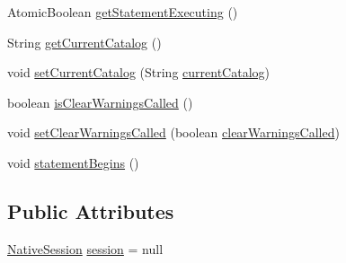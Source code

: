 \begin{DoxyCompactItemize}
\item 
Atomic\+Boolean \mbox{\hyperlink{classcom_1_1mysql_1_1cj_1_1_abstract_query_a1d16480e9a825e13d276fc18c90279cb}{get\+Statement\+Executing}} ()
\item 
String \mbox{\hyperlink{classcom_1_1mysql_1_1cj_1_1_abstract_query_a77d27488fdee8947c779e97796b433c3}{get\+Current\+Catalog}} ()
\item 
void \mbox{\hyperlink{classcom_1_1mysql_1_1cj_1_1_abstract_query_abf73f90a5df9f9b8efc2cc2aa477dfd8}{set\+Current\+Catalog}} (String \mbox{\hyperlink{classcom_1_1mysql_1_1cj_1_1_abstract_query_a1b25ce6bc0b1b35dca039d246b51da60}{current\+Catalog}})
\item 
boolean \mbox{\hyperlink{classcom_1_1mysql_1_1cj_1_1_abstract_query_a27bdd1ed787ed128edbbd307731e8120}{is\+Clear\+Warnings\+Called}} ()
\item 
void \mbox{\hyperlink{classcom_1_1mysql_1_1cj_1_1_abstract_query_a3a7177c2aad4e5a75cb3cbb556c05961}{set\+Clear\+Warnings\+Called}} (boolean \mbox{\hyperlink{classcom_1_1mysql_1_1cj_1_1_abstract_query_ad74a8ec76b857307a4271c7078454b8c}{clear\+Warnings\+Called}})
\item 
void \mbox{\hyperlink{classcom_1_1mysql_1_1cj_1_1_abstract_query_ad497079522b832383db2916bcef4a74c}{statement\+Begins}} ()
\end{DoxyCompactItemize}
\subsection*{Public Attributes}
\begin{DoxyCompactItemize}
\item 
\mbox{\hyperlink{classcom_1_1mysql_1_1cj_1_1_native_session}{Native\+Session}} \mbox{\hyperlink{classcom_1_1mysql_1_1cj_1_1_abstract_query_ad3cd7870c1da389d1e671d1af30aa6b4}{session}} = null
\end{DoxyCompactItemize}
